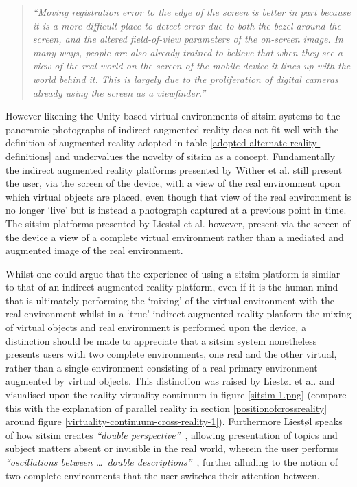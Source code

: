 \begin{quote}
	\textit{``Moving registration error to the edge of the screen is better in part because it is a more difficult place to detect error due to both the bezel around the screen, and the altered field-of-view parameters of the on-screen image. In many ways, people are also already trained to believe that when they see a view of the real world on the screen of the mobile device it lines up with the world behind it. This is largely due to the proliferation of digital cameras already using the screen as a viewfinder.''}~\cite{Wither2011}
\end{quote}

However likening the Unity based virtual environments of sitsim systems to the panoramic photographs of indirect augmented reality does not fit well with the definition of augmented reality adopted in table \ref{adopted-alternate-reality-definitions} and undervalues the novelty of sitsim as a concept. Fundamentally the indirect augmented reality platforms presented by Wither et al. still present the user, via the screen of the device, with a view of the real environment upon which virtual objects are placed, even though that view of the real environment is no longer `live' but is instead a photograph captured at a previous point in time. The sitsim platforms presented by Liest\o l et al. however, present via the screen of the device a view of a complete virtual environment rather than a mediated and augmented image of the real environment.

Whilst one could argue that the experience of using a sitsim platform is similar to that of an indirect augmented reality platform, even if it is the human mind that is ultimately performing the `mixing' of the virtual environment with the real environment whilst in a `true' indirect augmented reality platform the mixing of virtual objects and real environment is performed upon the device, a distinction should be made to appreciate that a sitsim system nonetheless presents users with two complete environments, one real and the other virtual, rather than a single environment consisting of a real primary environment augmented by virtual objects. This distinction was raised by Liest\o l et al. and visualised upon the reality-virtuality continuum in figure \ref{sitsim-1.png} (compare this with the explanation of parallel reality in section \ref{positionofcrossreality} around figure \ref{virtuality-continuum-cross-reality-1}). Furthermore Liest\o l speaks of how sitsim creates \textit{``double perspective''}~\cite{Liestøl2009}, allowing presentation of topics and subject matters absent or invisible in the real world, wherein the user performs \textit{``oscillations between \ldots\ double descriptions''}~\cite{Liestøl2014}, further alluding to the notion of two complete environments that the user switches their attention between.

